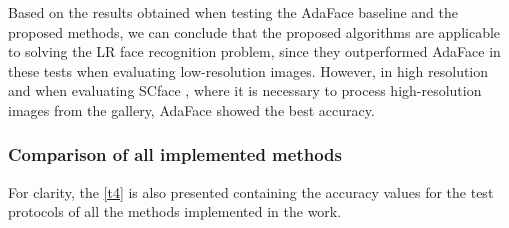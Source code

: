 \documentclass[11pt,a4paper]{article}
\begin{document}
Based on the results obtained when testing the AdaFace \cite{adaface} baseline and the proposed methods, we can conclude that the proposed algorithms are applicable to solving the LR face recognition problem, since they outperformed AdaFace \cite{adaface} in these tests when evaluating low-resolution images. However, in high resolution and when evaluating SCface \cite{scface}, where it is necessary to process high-resolution images from the gallery, AdaFace \cite{adaface} showed the best accuracy.

\subsubsection{Comparison of all implemented methods}
For clarity, the \ref{t4} is also presented containing the accuracy values for the test protocols of all the methods implemented in the work.

\begin{table}[ht!]
\begin{center}
\caption{Comparison of the accuracy of all implemented methods and AdaFace obtained at 10 fold cross-validation}
\label{t4}
\end{center}
\end{table}
\newpage
\end{document}
